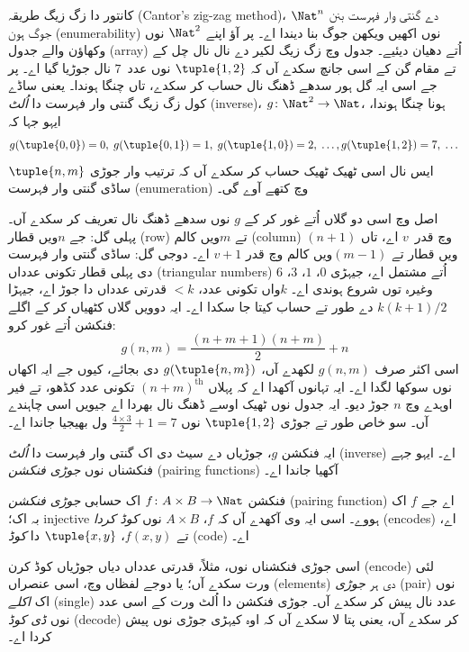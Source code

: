 \documentclass[../../../include/open-logic-section]{subfiles}
\begin{document}

\begin{explain}
کانتور دا زگ زیگ طریقہ (Cantor's zig-zag method)، $\Nat^n$ دے گنتی وار
فہرست بنن جوگ ہون (enumerability) نوں اکھیں ویکھن جوگ بنا دیندا اے۔
پر آؤ اپنے $\Nat^2$ نوں وکھاؤن والے جدول (array) اُتے دھیان دیئیے۔
جدول وچ زگ زیگ لکیر دے نال نال چل کے تے مقام گن کے اسی جانچ سکدے آں
کہ $\tuple{1,2}$ نوں عدد~$7$ نال جوڑیا گیا اے۔ پر جے اسی ایہ گل ہور
سدھے ڈھنگ نال حساب کر سکدے، تاں چنگا ہوندا۔ یعنی ساڈے کول زگ زیگ
گنتی وار فہرست دا \emph{اُلٹ} (inverse)،
$g\colon \Nat^2 \to \Nat$، ہونا چنگا ہوندا، ایہو جہا کہ
\[
g(\tuple{0,0}) = 0, \;
g(\tuple{0,1}) = 1, \;
g(\tuple{1,0}) = 2, \; \dots,
g(\tuple{1,2}) = 7, \; \dots
\]
ایس نال اسی ٹھیک ٹھیک حساب کر سکدے آں کہ ترتیب وار جوڑی
$\tuple{n, m}$ ساڈی گنتی وار فہرست (enumeration) وچ کتھے آوے گی۔

اصل وچ اسی دو گلاں اُتے غور کر کے $g$ نوں سدھے ڈھنگ نال تعریف کر سکدے
آں۔ پہلی گل: جے $n$ویں قطار (row) تے $m$ویں کالم (column) وچ قدر~$v$
اے، تاں $(n+1)$ویں قطار تے $(m-1)$ویں کالم وچ قدر $v + 1$ اے۔ دوجی
گل: ساڈی گنتی وار فہرست دی پہلی قطار تکونی عدداں (triangular numbers)
اُتے مشتمل اے، جیہڑی
$0$، $1$، $3$، $6$ وغیرہ توں شروع ہوندی اے۔ $k$واں تکونی عدد،
$< k$ قدرتی عدداں دا جوڑ اے، جیہڑا $k(k+1)/2$ دے طور تے حساب کیتا جا
سکدا اے۔ ایہ دوویں گلاں کٹھیاں کر کے اگلے فنکشن اُتے غور کرو:
\[
  g(n,m) = \frac{(n+m+1)(n+m)}{2} + n
\]
اسی اکثر صرف $g(n, m)$ لکھدے آں، $g(\tuple{n, m})$ دی بجائے، کیوں جے
ایہ اکھاں نوں سوکھا لگدا اے۔ ایہ تہانوں آکھدا اے کہ پہلاں
$(n+m)^\text{th}$ تکونی عدد کڈھو، تے فیر اوہدے وچ $n$ جوڑ دیو۔ ایہ
جدول نوں ٹھیک اوسے ڈھنگ نال بھردا اے جیویں اسی چاہندے آں۔ سو خاص طور
تے جوڑی $\tuple{1, 2}$ نوں $\frac{4 \times 3}{2} +
1 = 7$ ول بھیجیا جاندا اے۔

ایہ فنکشن $g$، جوڑیاں دے سیٹ دی اک گنتی وار فہرست دا \emph{اُلٹ}
(inverse) اے۔ ایہو جہے فنکشناں نوں \emph{جوڑی فنکشن} (pairing
functions) آکھیا جاندا اے۔
\end{explain}

\begin{defn}
  فنکشن $f\colon A \times B \to \Nat$ اک حسابی
  \emph{جوڑی فنکشن} (pairing function) اے جے $f$ اک بہ اک؛ injective
  ہووے۔ اسی ایہ وی آکھدے آں کہ $f$، $A \times B$ نوں \emph{کوڈ کردا}
  (encodes) اے، تے $f(x,y)$، $\tuple{x,y}$ دا \emph{کوڈ} (code) اے۔
\end{defn}

\begin{explain}
اسی جوڑی فنکشناں نوں، مثلاً، قدرتی عدداں دیاں جوڑیاں کوڈ کرن
(encode) لئی ورت سکدے آں؛ یا دوجے لفظاں وچ، اسی عنصراں (elements) دی
ہر \emph{جوڑی} (pair) نوں اک \emph{اکلے} (single) عدد نال پیش کر سکدے
آں۔ جوڑی فنکشن دا اُلٹ ورت کے اسی عدد نوں \emph{ڈی کوڈ} (decode) کر
سکدے آں، یعنی پتا لا سکدے آں کہ اوہ کیہڑی جوڑی نوں پیش کردا اے۔
\end{explain}
\end{document}
